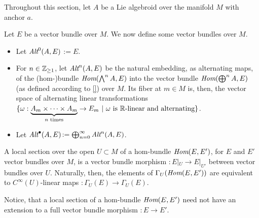 \linea 

Throughout this section, let $A$ be a Lie algebroid over the manifold $M$ with anchor $a$.

\begin{definition}
Let $E$ be a vector bundle over $M$. We now define some vector bundles over $M$.
    \begin{itemize}
    
    \item Let \emph{$\operatorname{\textit{Alt}}^0(A, E)$}$:= E$. 
    
    \item For $n \in \mathbb{Z}_{\geq 1}$, let \emph{$\operatorname{\textit{Alt}}^n(A, E)$} be the natural embedding, as alternating maps, of the (hom-)bundle $\operatorname{\textit{Hom}}(\bigwedge^n A, E)$ into the vector bundle $\operatorname{\textit{Hom}}(\bigoplus^n A, E)$ (as defined according to \ref{}) over $M$. Its fiber at $m \in M$ is, then, the vector space of alternating linear transformations $\{\omega: \underbrace{A_m \times \cdots \times A_m}_{\text{$n$ times}} \to E_m \ |\  \text{$\omega$ is $\mathbb{R}$-linear and alternating}\}$.
    
    \item Let \emph{$\operatorname{\textit{Alt}}^\bullet(A, E)$}$:= \bigoplus^\infty_{n = 0} \operatorname{\textit{Alt}}^n(A, E)$.
    
        
    \end{itemize}
    
\end{definition}

\begin{remark}
A local section over the open $U \subset M$ of a hom-bundle $\operatorname{\textit{Hom}}(E, E')$, for $E$ and $E'$ vector bundles over $M$, is a vector bundle morphism $:E|_U \to E|_{U'}$ between vector bundles over $U$. Naturally, then, the elements of $\Gamma_U(\operatorname{\textit{Hom}}(E, E'))$ are equivalent to $C^\infty(U)$-linear maps $: \Gamma_U(E) \to \Gamma_U(E)$. 

Notice, that a local section of a hom-bundle $\operatorname{\textit{Hom}}(E, E')$ need not have an extension to a full vector bundle morphism $:E \to E'$.
\end{remark}

